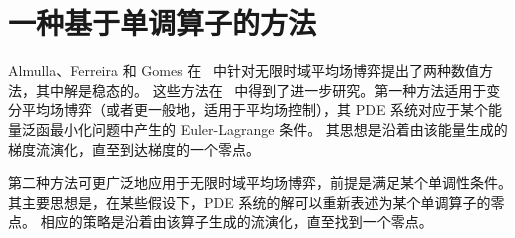 \documentclass{amsproc}
\theoremstyle{definition}
\theoremstyle{remark}
\numberwithin{equation}{section}
\begin{document}
\clearpage


\section{\bf 一种基于单调算子的方法}
\label{AMS-num-sec:monotone-op}


Almulla、Ferreira 和 Gomes 在~\cite{MR3698446} 中针对无限时域平均场博弈提出了两种数值方法，其中解是稳态的。
 这些方法在~\cite{GomesSaude2018,GomesYang2018hessian} 中得到了进一步研究。第一种方法适用于变分平均场博弈（或者更一般地，适用于平均场控制），其 PDE 系统对应于某个能量泛函最小化问题中产生的 Euler-Lagrange 条件。
 其思想是沿着由该能量生成的梯度流演化，直至到达梯度的一个零点。


 第二种方法可更广泛地应用于无限时域平均场博弈，前提是满足某个单调性条件。
 其主要思想是，在某些假设下，PDE 系统的解可以重新表述为某个单调算子的零点。
 相应的策略是沿着由该算子生成的流演化，直至找到一个零点。
\end{document}
